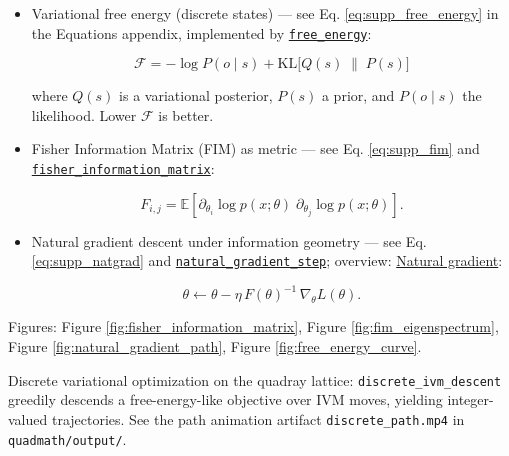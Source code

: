\documentclass[
  10pt,
]{article}
\begin{document}
\begin{itemize}
\item
  Variational free energy (discrete states) --- see Eq.
  \eqref{eq:supp_free_energy} in the Equations appendix, implemented by
  \href{08_equations_appendix.md\#code:free_energy}{\texttt{free\_energy}}:

  \begin{equation}\label{eq:free_energy_appendix_ref}
  \mathcal{F} = -\log P(o\mid s) + \mathrm{KL}\big[ Q(s)\;\|\; P(s) \big]
  \end{equation}

  where \(Q(s)\) is a variational posterior, \(P(s)\) a prior, and
  \(P(o\mid s)\) the likelihood. Lower \(\mathcal{F}\) is better.
\item
  Fisher Information Matrix (FIM) as metric --- see Eq.
  \eqref{eq:supp_fim} and
  \href{08_equations_appendix.md\#code:fisher_information_matrix}{\texttt{fisher\_information\_matrix}}:

  \begin{equation}\label{eq:fim_definition}
  F_{i,j} = \mathbb{E}\left[ \partial_{\theta_i} \log p(x;\theta)\; \partial_{\theta_j} \log p(x;\theta) \right].
  \end{equation}
\item
  Natural gradient descent under information geometry --- see Eq.
  \eqref{eq:supp_natgrad} and
  \href{08_equations_appendix.md\#code:natural_gradient_step}{\texttt{natural\_gradient\_step}};
  overview:
  \href{https://en.wikipedia.org/wiki/Natural_gradient}{Natural
  gradient}:

  \begin{equation}\label{eq:natural_gradient_update}
  \theta \leftarrow \theta - \eta\, F(\theta)^{-1}\, \nabla_{\theta} L(\theta).
  \end{equation}
\end{itemize}

Figures: Figure \ref{fig:fisher_information_matrix}, Figure
\ref{fig:fim_eigenspectrum}, Figure \ref{fig:natural_gradient_path},
Figure \ref{fig:free_energy_curve}.

Discrete variational optimization on the quadray lattice:
\texttt{discrete\_ivm\_descent} greedily descends a free-energy-like
objective over IVM moves, yielding integer-valued trajectories. See the
path animation artifact \texttt{discrete\_path.mp4} in
\texttt{quadmath/output/}.
\end{document}
